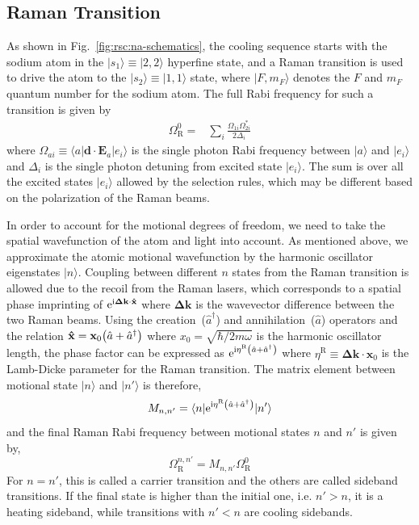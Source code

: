 \subsection{Raman Transition}
\label{ch:rsc:basic-theory:raman}

As shown in Fig.~\ref{fig:rsc:na-schematics},
the cooling sequence starts with the sodium atom in the
$|s_1\rangle\equiv|2,2\rangle$ hyperfine state,
and a Raman transition is used to drive the atom to the $|s_2\rangle\equiv|1,1\rangle$ state,
where $|F,m_F\rangle$ denotes the $F$ and $m_F$ quantum number for the sodium atom.
The full Rabi frequency for such a transition is given by~\cite{knight_quantum_2003}
\begin{align}
  \Omega_{\mathrm{R}}^0=&\sum_{i}\frac{\Omega_{1i}\Omega_{2i}^*}{2\Delta_i}\label{eq:rsc:basic-theory:raman-rabi}
\end{align}
where $\Omega_{ai}\equiv\langle a|\mathbf{d}\cdot\mathbf{E}_a|e_i\rangle$ is the single photon
Rabi frequency between $|a\rangle$ and $|e_i\rangle$
and $\Delta_i$ is the single photon detuning from excited state $|e_i\rangle$.
The sum is over all the excited states $|e_i\rangle$ allowed by the selection rules,
which may be different based on the polarization of the Raman beams.

In order to account for the motional degrees of freedom, we need to take the spatial
wavefunction of the atom and light into account.
As mentioned above, we approximate the atomic motional wavefunction by the harmonic oscillator
eigenstates $|n\rangle$. Coupling between different $n$ states from the Raman transition
is allowed due to the recoil from the Raman lasers,
which corresponds to a spatial phase imprinting of $\mathrm{e}^{\mathrm{i}\mathbf{\Delta k}\cdot\mathbf{\hat x}}$
where $\mathbf{\Delta k}$ is the wavevector difference between the two Raman beams.
Using the creation~($\hat a^\dagger$) and annihilation~($\hat a$) operators and the relation
$\mathbf{\hat x}=\mathbf{x}_0{\left({\hat a+\hat a^\dagger}\right)}$ where $x_0=\sqrt{\hbar/2m\omega}$
is the harmonic oscillator length, the phase factor can be expressed as
$\mathrm{e}^{\mathrm{i}\eta^{\mathrm{R}}{\left({\hat a+\hat a^\dagger}\right)}}$ where $\eta^{\mathrm{R}}\equiv\mathbf{\Delta k}\cdot\mathbf{x}_0$
is the Lamb-Dicke parameter for the Raman transition.
The matrix element between motional state $|n\rangle$ and $|n'\rangle$ is therefore,
\[ M_{n,n'}=\langle n|\mathrm{e}^{\mathrm{i}\eta^{\mathrm{R}}{\left({\hat a+\hat a^\dagger}\right)}}|n'\rangle \]
and the final Raman Rabi frequency between motional states $n$ and $n'$ is given by,
\[ \Omega_{\mathrm{R}}^{n,n'}=M_{n,n'}\Omega_{\mathrm{R}}^0 \]
For $n=n'$, this is called a carrier transition and the others are called sideband transitions.
If the final state is higher than the initial one, i.e. $n'>n$, it is a heating sideband,
while transitions with $n'<n$ are cooling sidebands.

